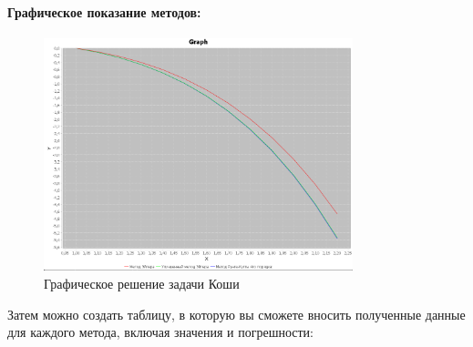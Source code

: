 \documentclass[12pt]{article}
\begin{document}
    \paragraph*{Графическое показание методов:}

    \begin{figure}[h]
        \centering
        \includegraphics[width=0.8\textwidth]{image/graph_koshi}
        \caption{Графическое решение задачи Коши}
        \label{fig:graphical_solution}
    \end{figure}

    Затем можно создать таблицу, в которую вы сможете вносить полученные данные для каждого метода, включая значения и погрешности:

    \clearpage
\end{document}
